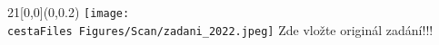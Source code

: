 ﻿\begin{textblock}{21}[0,0](0,0.2)
    \ifnum {}
        \texttt{[image: \\cestaFiles Figures/Scan/zadani\_2022.jpeg]}
    \else
        \vglue 13cm
        \hspace{5cm}
        {\huge Zde vložte originál zadání!!!}
    \fi
\end{textblock}


